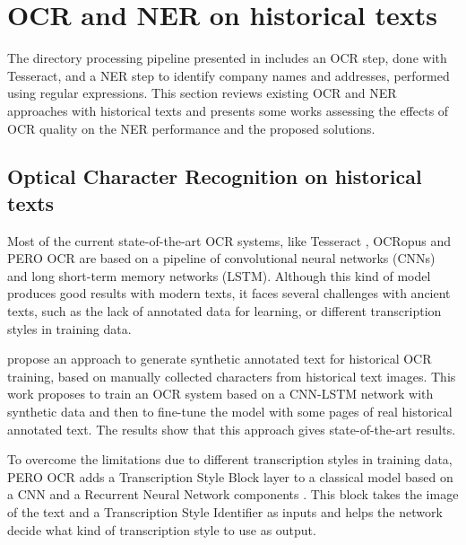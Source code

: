\section{OCR and NER on historical texts}
\label{sec:related-work}


The directory processing pipeline presented in \cite{bell2020automated} includes an OCR step, done with Tesseract, and a NER step to identify company names and addresses, performed using regular expressions.
This section reviews existing OCR and NER approaches with historical texts and presents some works assessing the effects of OCR quality on the NER performance and the proposed solutions. 

\subsection{Optical Character Recognition on historical texts}

Most of the current state-of-the-art OCR systems, like Tesseract \cite{smith2007overview}, OCRopus \cite{breuel2008ocropus} and PERO OCR \cite{kohut2021ts} are based on a pipeline of convolutional neural networks (CNNs) and long short-term memory networks (LSTM).
Although this kind of model produces good results with modern texts, it faces several challenges with ancient texts, such as the lack of annotated data for learning, or different transcription styles in training data.

\cite{martinek2019hybrid} propose an approach to generate synthetic annotated text for historical OCR training, based on manually collected characters from historical text images.
This work proposes to train an OCR system based on a CNN-LSTM network with synthetic data and then to fine-tune the model with some pages of real historical annotated text.
The results show that this approach gives state-of-the-art results. 

To overcome the limitations due to different transcription styles in training data, PERO OCR adds a Transcription Style Block layer to a classical model based on a CNN and a Recurrent Neural Network components \cite{kohut2021ts}.
This block takes the image of the text and a Transcription Style Identifier as inputs and helps the network decide what kind of transcription style to use as output.

